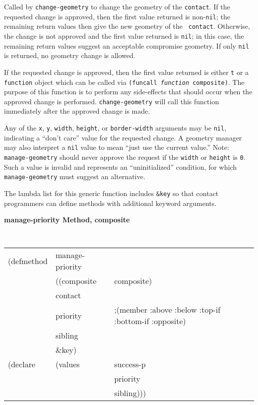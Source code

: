 \begin{flushright} 
\parbox[t]{6.125in}{
Called by {\tt change-geometry}
to change the geometry of the
{\tt contact}.
If the requested change is approved, then  the first value returned is
non-{\tt nil}; the remaining return values then give the new geometry of the {\tt
contact}.  Otherwise, the change is not approved and the first value returned is
{\tt nil}; in this case, the remaining return values suggest an acceptable
compromise geometry.
If only {\tt nil} is returned, no geometry change is allowed.
}

\parbox[t]{6.125in}{ If the requested change is approved, then the first value
returned is either {\tt t} or a {\tt function} object which can be called via
{\tt (funcall {\em function} composite)}. The purpose of this function is to
perform any side-effects that should occur when the approved change is
performed. {\tt change-geometry} will call this function immediately after the
approved change is made.}

\parbox[t]{6.125in}{
Any of the {\tt x}, {\tt y}, {\tt width}, {\tt height}, or {\tt border-width}
arguments may be {\tt nil}, indicating a ``don't care'' value for the requested
change. A geometry manager may also interpret a {\tt nil} value to mean ``just
use the current value.''
Note: {\tt manage-geometry} should never approve the request if the {\tt width}
or {\tt height} is {\tt 0}. Such a value is invalid and represents an
``uninitialized'' condition, for which {\tt manage-geometry} must suggest
an alternative.
}

\parbox[t]{6.125in}{
The lambda list for this generic function includes {\tt \&key} so that contact
programmers can define methods with additional keyword arguments.
}
\end{flushright}
 

{\samepage
{\large {\bf manage-priority \hfill Method, composite}}
\begin{flushright} \parbox[t]{6.125in}{
\tt
\begin{tabular}{lll}
\raggedright
(defmethod & manage-priority & \\
& ((composite  &composite)\\
& contact\\
& priority & ;(member :above :below :top-if :bottom-if :opposite)\\
& sibling\\
& \&key) \\
(declare &(values &success-p\\
& & priority\\
& & sibling)))
\end{tabular}
\rm

}\end{flushright}}

